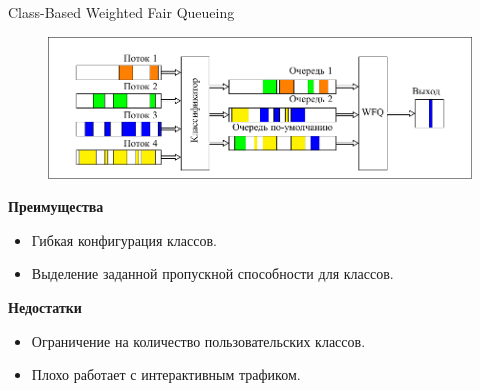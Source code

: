 \documentclass[12pt]{beamer}
\begin{document}
\begin{frame}{Class-Based Weighted Fair Queueing}
	\begin{figure}
		\center
    	\includegraphics[scale=0.7]{../text/src/pdfimages/cbwfq.pdf}
	\end{figure}

	\begin{center}
{\footnotesize
            \begin{multicols}{2}
				{\bf Преимущества}
				\begin{itemize}
					\item Гибкая конфигурация классов.
					\item Выделение заданной пропускной способности для классов.
				\end{itemize}
            \columnbreak
				{\bf Недостатки}
				\begin{itemize}
					\item Ограничение на количество пользовательских классов.
					\item Плохо работает с интерактивным трафиком.
				\end{itemize}
            \end{multicols}
}
	\end{center}
\end{frame}
\end{document}
